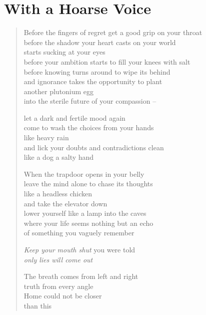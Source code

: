\clearpage

\section{With a Hoarse Voice}

\begin{verse}

Before the fingers of regret get a good grip on your throat\\
before the shadow your heart casts on your world\\
starts sucking at your eyes\\
before your ambition starts to fill your knees with salt\\
before knowing turns around to wipe its behind\\
and ignorance takes the opportunity to plant\\
another plutonium egg\\
into the sterile future of your compassion --

let a dark and fertile mood again\\
come to wash the choices from your hands\\
like heavy rain\\
and lick your doubts and contradictions clean\\
like a dog a salty hand

When the trapdoor opens in your belly\\
leave the mind alone to chase its thoughts\\
like a headless chicken\\
and take the elevator down\\
lower yourself like a lamp into the caves\\
where your life seems nothing but an echo\\
of something you vaguely remember

\clearpage

\emph{Keep your mouth shut} you were told\\
\emph{only lies will come out}

The breath comes from left and right\\
truth from every angle\\
Home could not be closer\\
than this

\end{verse}

\restoregeometry

